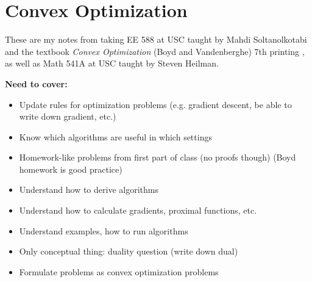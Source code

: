%
%
%
%
%
%
%
%
%
%
%
%
%
%

\chapter{Convex Optimization}

These are my notes from taking EE 588 at USC taught by Mahdi Soltanolkotabi and the textbook \textit{Convex Optimization} (Boyd and Vandenberghe) 7th printing \citep{boyd2004convex}, as well as Math 541A at USC taught by Steven Heilman.

\textbf{Need to cover:}

\begin{itemize}

\item Update rules for optimization problems (e.g. gradient descent, be able to write down gradient, etc.)

\item Know which algorithms are useful in which settings

\item Homework-like problems from first part of class (no proofs though) (Boyd homework is good practice)

\item Understand how to derive algorithms

\item Understand how to calculate gradients, proximal functions, etc.

\item Understand examples, how to run algorithms

\item Only conceptual thing: duality question (write down dual)

\item Formulate problems as convex optimization problems

\end{itemize}


